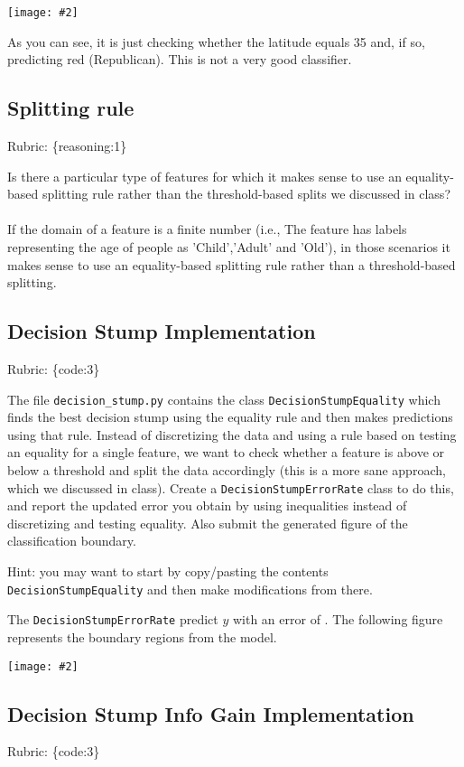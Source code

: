 \documentclass{article}
\def\rubric#1{\gre{Rubric: \{#1\}}}{}
\def\blu#1{{\color{blu}#1}}
\def\gre#1{{\color{gre}#1}}
\def\ans#1{{\color{ans}#1}}
\newcommand{\centerfig}[2]{\begin{center}\texttt{[image: \#2]}\end{center}}
\begin{document}
\centerfig{0.7}{../figs/q6_decisionBoundary}

As you can see, it is just checking whether the latitude equals 35 and, if so, predicting red (Republican).
This is not a very good classifier. 

\subsection{Splitting rule}
\rubric{reasoning:1}

Is there a particular type of features for which it makes sense to use an equality-based splitting rule rather than the threshold-based splits we discussed in class? \\
\\
\ans{If the domain of a feature is a finite number (i.e., The feature has labels representing the age of people as 'Child','Adult' and 'Old'), in those scenarios it makes sense to use an equality-based splitting rule rather than a threshold-based splitting. }

\subsection{Decision Stump Implementation}
\rubric{code:3}

The file \texttt{decision\string_stump.py} contains the class \texttt{DecisionStumpEquality} which 
finds the best decision stump using the equality rule and then makes predictions using that
rule. Instead of discretizing the data and using a rule based on testing an equality for 
a single feature, we want to check whether a feature is above or below a threshold and 
split the data accordingly (this is a more sane approach, which we discussed in class). 
\blu{Create a \texttt{DecisionStumpErrorRate} class to do this, and report the updated error you 
obtain by using inequalities instead of discretizing and testing equality. Also submit the generated figure of the classification boundary.}

Hint: you may want to start by copy/pasting the contents \texttt{DecisionStumpEquality} and then make modifications from there. 

\ans{
    The \texttt{DecisionStumpErrorRate} predict $y$ with an error of \fbox{0.280}. The following figure
    represents the boundary regions from the model.
}

\centerfig{0.7}{../figs/q6_2_decisionBoundary}

\subsection{Decision Stump Info Gain Implementation}
\rubric{code:3}
\end{document}
